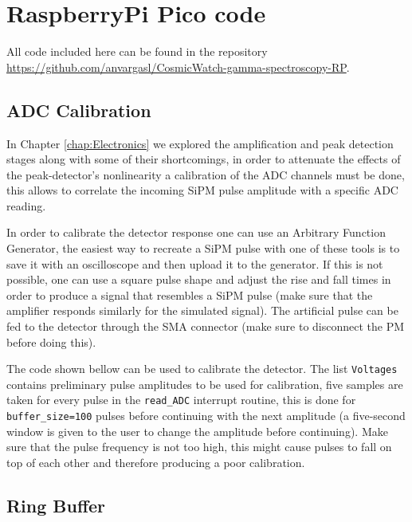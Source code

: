 \chapter{RaspberryPi Pico code}\label{app:RP_Pico_code}

All code included here can be found in the repository \\ \href{https://github.com/anvargasl/CosmicWatch-gamma-spectroscopy-RP}{https://github.com/anvargasl/CosmicWatch-gamma-spectroscopy-RP}.

\section{ADC Calibration}

In Chapter \ref{chap:Electronics} we explored the amplification and peak detection stages along with some of their shortcomings, in order to attenuate the effects of the peak-detector's nonlinearity a calibration of the ADC channels must be done, this allows to correlate the incoming SiPM pulse amplitude with a specific ADC reading.

In order to calibrate the detector response one can use an Arbitrary Function Generator, the easiest way to recreate a SiPM pulse with one of these tools is to save it with an oscilloscope and then upload it to the generator. If this is not possible, one can use a square pulse shape and adjust the rise and fall times in order to produce a signal that resembles a SiPM pulse (make sure that the amplifier responds similarly for the simulated signal). The artificial pulse can be fed to the detector through the SMA connector (make sure to disconnect the PM before doing this).

The code shown bellow can be used to calibrate the detector. The list \texttt{Voltages} contains preliminary pulse amplitudes to be used for calibration, five samples are taken for every pulse in the \texttt{read\_ADC} interrupt routine, this is done for \texttt{buffer\_size=100} pulses before continuing with the next amplitude (a five-second window is given to the user to change the amplitude before continuing). Make sure that the pulse frequency is not too high, this might cause pulses to fall on top of each other and therefore producing a poor calibration.



\section{Ring Buffer}

